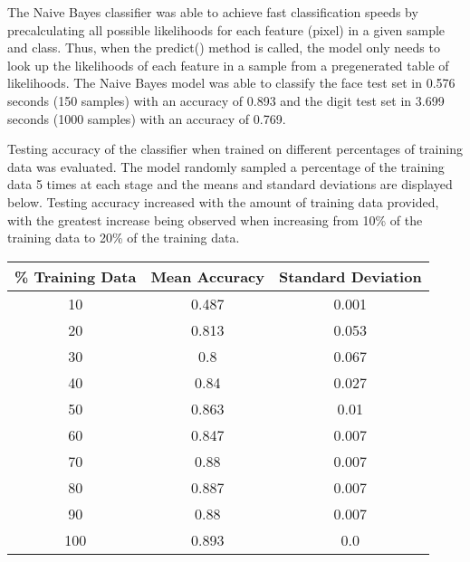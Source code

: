 \documentclass[11pt]{article}
\begin{document}
    The Naive Bayes classifier was able to achieve fast classification speeds by precalculating all possible likelihoods for each feature (pixel) in a given sample and class. Thus, when the predict() method is called, the model only needs to look up the likelihoods of each feature in a sample from a pregenerated table of likelihoods. The Naive Bayes model was able to classify the face test set in 0.576 seconds (150 samples) with an accuracy of 0.893 and the digit test set in 3.699 seconds (1000 samples) with an accuracy of 0.769.

    Testing accuracy of the classifier when trained on different percentages of training data was evaluated. The model randomly sampled a percentage of the training data 5 times at each stage and the means and standard deviations are displayed below. Testing accuracy increased with the amount of training data provided, with the greatest increase being observed when increasing from 10\% of the training data to 20\% of the training data.
    
    \begin{center}
    \begin{tabular}{||c c c||} 
     \hline
     \% Training Data & Mean Accuracy & Standard Deviation \\ [0.5ex] 
     \hline\hline
     10 & 0.487 & 0.001 \\ 
     \hline
     20 & 0.813 & 0.053 \\ 
     \hline
     30 & 0.8 & 0.067 \\ 
     \hline
     40 & 0.84 & 0.027 \\ 
     \hline
     50 & 0.863 & 0.01 \\ 
     \hline
     60 & 0.847 & 0.007 \\ 
     \hline
     70 & 0.88 & 0.007 \\ 
     \hline
     80 & 0.887 & 0.007 \\ 
     \hline
     90 & 0.88 & 0.007 \\ 
     \hline
     100 & 0.893 & 0.0 \\ 
     \hline
    \end{tabular}
    \end{center}
\end{document}
